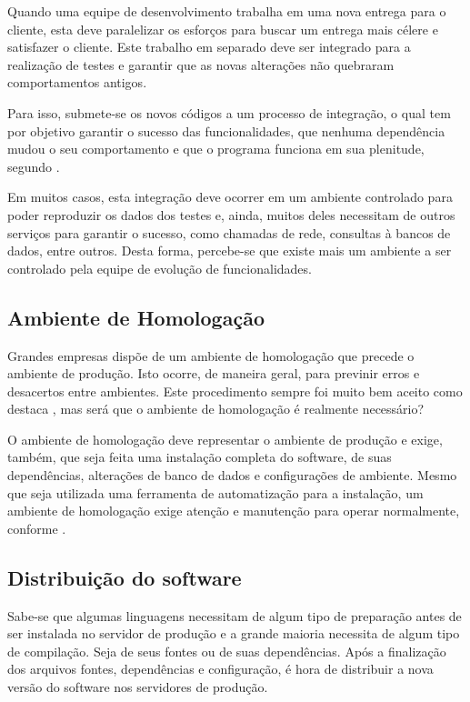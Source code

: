\documentclass[
	12pt,				%
	openright,			%
	oneside,			%
	a4paper,			%
	chapter=TITLE,		%
	section=TITLE,		%
	english,			%
	french,				%
	spanish,			%
	brazil				%
	]{abntex2}
\begin{document}
Quando uma equipe de desenvolvimento trabalha em uma nova entrega para o cliente, esta deve paralelizar os esforços para buscar um entrega mais célere e satisfazer o cliente. Este trabalho em separado deve ser integrado para a realização de testes e garantir que as novas alterações não quebraram comportamentos antigos.

Para isso, submete-se os novos códigos a um processo de integração, o qual tem por objetivo garantir o sucesso das funcionalidades, que nenhuma dependência mudou o seu comportamento e que o programa funciona em sua plenitude, segundo .

Em muitos casos, esta integração deve ocorrer em um ambiente controlado para poder reproduzir os dados dos testes e, ainda, muitos deles necessitam de outros serviços para garantir o sucesso, como chamadas de rede, consultas à bancos de dados, entre outros. Desta forma, percebe-se que existe mais um ambiente a ser controlado pela equipe de evolução de funcionalidades.

\subsection{Ambiente de Homologação}

Grandes empresas dispõe de um ambiente de homologação que precede o ambiente de produção. Isto ocorre, de maneira geral, para previnir erros e desacertos entre ambientes. Este procedimento sempre foi muito bem aceito como destaca , mas será que o ambiente de homologação é realmente necessário?

O ambiente de homologação deve representar o ambiente de produção e exige, também, que seja feita uma instalação completa do software, de suas dependências, alterações de banco de dados e configurações de ambiente. Mesmo que seja utilizada uma ferramenta de automatização para a instalação, um ambiente de homologação exige atenção e manutenção para operar normalmente, conforme .

\subsection{Distribuição do software}

Sabe-se que algumas linguagens necessitam de algum tipo de preparação antes de ser instalada no servidor de produção e a grande maioria necessita de algum tipo de compilação. Seja de seus fontes ou de suas dependências. Após a finalização dos arquivos fontes, dependências e configuração, é hora de distribuir a nova versão do software nos servidores de produção.
\end{document}
